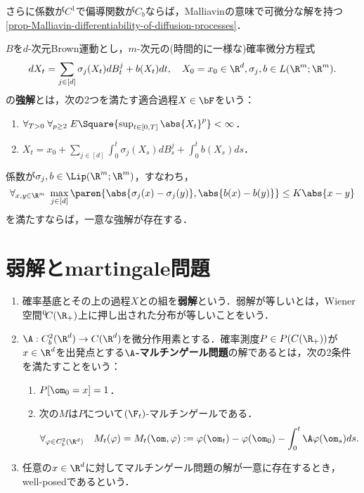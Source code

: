 \documentclass[uplatex,dvipdfmx]{jsreport}
\begin{document}
\begin{tcolorbox}[colframe=ForestGreen, colback=ForestGreen!10!white,breakable,colbacktitle=ForestGreen!40!white,coltitle=black,fonttitle=\bfseries\sffamily,
title=]
    さらに係数が$C^1$で偏導関数が$C_b$ならば，Malliavinの意味で可微分な解を持つ\ref{prop-Malliavin-differentiability-of-diffusion-processes}．
\end{tcolorbox}

\begin{definition}
    $B$を$d$-次元Brown運動とし，$m$-次元の(時間的に一様な)確率微分方程式
    \[dX_t=\sum_{j\in[d]}\sigma_j(X_t)dB_t^j+b(X_t)dt,\quad X_0=x_0\in\R^d,\sigma_j,b\in L(\R^m;\R^m).\]
    の\textbf{強解}とは，次の2つを満たす適合過程$X\in\bF$をいう：
    \begin{enumerate}
        \item $\forall_{T>0}\;\forall_{p\ge2}\;E\Square{\sup_{t\in[0,T]}\abs{X_t}^p}<\infty$．
        \item $X_t=x_0+\sum_{j\in[d]}\int^t_0\sigma_j(X_s)dB_s^j+\int^t_0b(X_s)ds$．
    \end{enumerate}
\end{definition}

\begin{theorem}
    係数が$\sigma_j,b\in\Lip(\R^m;\R^m)$，すなわち，
    \[\forall_{x,y\in\R^m}\;\max_{j\in[d]}\paren{\abs{\sigma_j(x)-\sigma_j(y)},\abs{b(x)-b(y)}}\le K\abs{x-y}\]
    を満たすならば，一意な強解が存在する．
\end{theorem}

\section{弱解とmartingale問題}

\begin{definition}\mbox{}
    \begin{enumerate}
        \item 確率基底とその上の過程$X$との組を\textbf{弱解}という．弱解が等しいとは，Wiener空間${}^0\!C(\R_+)$上に押し出された分布が等しいことをいう．
        \item $\A:C^2_b(\R^d)\to C(\R^d)$を微分作用素とする．確率測度$P\in P(C(\R_+))$が$x\in\R^d$を出発点とする\textbf{$\A$-マルチンゲール問題}の解であるとは，次の2条件を満たすことをいう：
        \begin{enumerate}
            \item $P[\om_0=x]=1$．
            \item 次の$M$は$P$について$(\F_t)$-マルチンゲールである．
            \[\forall_{\varphi\in C^2_b(\R^d)}\quad M_t(\varphi)=M_t(\om,\varphi):=\varphi(\om_t)-\varphi(\om_0)-\int^t_0\A\varphi(\om_s)ds.\]
        \end{enumerate}
        \item 任意の$x\in\R^d$に対してマルチンゲール問題の解が一意に存在するとき，well-posedであるという．
    \end{enumerate}
\end{definition}
\end{document}
